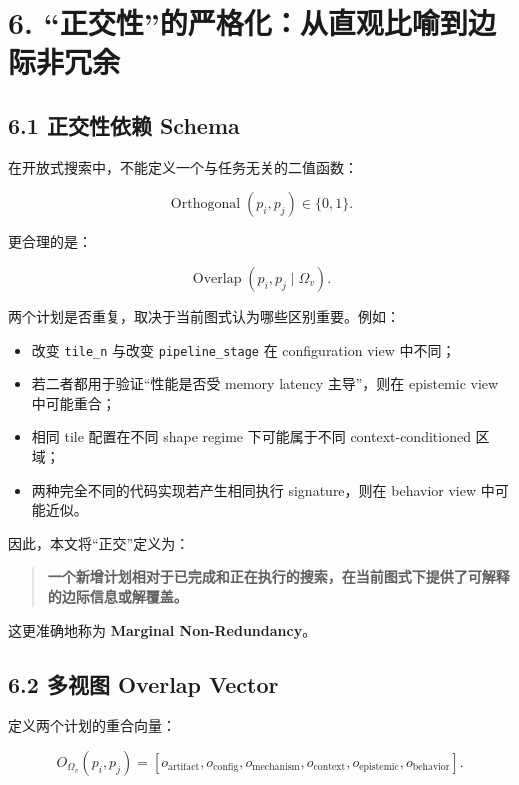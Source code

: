 \documentclass[
  11pt]{ctexart}
\providecommand{\tightlist}{%
  \setlength{\itemsep}{0pt}\setlength{\parskip}{0pt}}
\begin{document}
\section{6.
``正交性''的严格化：从直观比喻到边际非冗余}\label{ux6b63ux4ea4ux6027ux7684ux4e25ux683cux5316ux4eceux76f4ux89c2ux6bd4ux55bbux5230ux8fb9ux9645ux975eux5197ux4f59}

\subsection{6.1 正交性依赖
Schema}\label{ux6b63ux4ea4ux6027ux4f9dux8d56-schema}

在开放式搜索中，不能定义一个与任务无关的二值函数：

\[
\operatorname{Orthogonal}(p_i,p_j)\in\{0,1\}.
\]

更合理的是：

\[
\operatorname{Overlap}(p_i,p_j\mid\Omega_v).
\]

两个计划是否重复，取决于当前图式认为哪些区别重要。例如：

\begin{itemize}
\tightlist
\item
  改变 \texttt{tile\_n} 与改变 \texttt{pipeline\_stage} 在 configuration
  view 中不同；
\item
  若二者都用于验证``性能是否受 memory latency 主导''，则在 epistemic
  view 中可能重合；
\item
  相同 tile 配置在不同 shape regime 下可能属于不同 context-conditioned
  区域；
\item
  两种完全不同的代码实现若产生相同执行 signature，则在 behavior view
  中可能近似。
\end{itemize}

因此，本文将``正交''定义为：

\begin{quote}
\textbf{一个新增计划相对于已完成和正在执行的搜索，在当前图式下提供了可解释的边际信息或解覆盖。}
\end{quote}

这更准确地称为 \textbf{Marginal Non-Redundancy}。

\subsection{6.2 多视图 Overlap
Vector}\label{ux591aux89c6ux56fe-overlap-vector}

定义两个计划的重合向量：

\[
O_{\Omega_v}(p_i,p_j)=
[
 o_{\text{artifact}},
 o_{\text{config}},
 o_{\text{mechanism}},
 o_{\text{context}},
 o_{\text{epistemic}},
 o_{\text{behavior}}
].
\]
\end{document}
